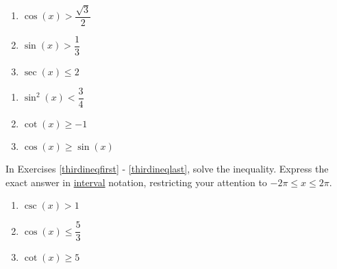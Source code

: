 \begin{multicols}{3}

\begin{enumerate}

\setcounter{enumi}{\value{HW}}

\item $\cos \left( x \right) > \dfrac{\sqrt{3}}{2}$ \label{secondineqefirst}
\item  $\sin(x) > \dfrac{1}{3}$ 
\item $\sec \left( x \right) \leq 2$ 

\setcounter{HW}{\value{enumi}}

\end{enumerate}

\end{multicols}

\begin{multicols}{3}

\begin{enumerate}

\setcounter{enumi}{\value{HW}}

\item $\sin^{2} \left( x \right) < \dfrac{3}{4}$
\item $\cot \left( x \right) \geq -1$ 
\item $\cos(x) \geq \sin(x)$  \label{secondineqlast}

\setcounter{HW}{\value{enumi}}

\end{enumerate}

\end{multicols}


In Exercises \ref{thirdineqfirst} - \ref{thirdineqlast}, solve the inequality.  Express the exact answer in \underline{interval} notation, restricting your attention to $-2\pi \leq x \leq 2\pi$.

\begin{multicols}{3}

\begin{enumerate}

\setcounter{enumi}{\value{HW}}

\item $\csc \left( x \right) > 1$  \label{thirdineqfirst}
\item  $\cos(x) \leq \dfrac{5}{3}$
\item  $\cot(x) \geq 5$ 

\setcounter{HW}{\value{enumi}}

\end{enumerate}

\end{multicols}

